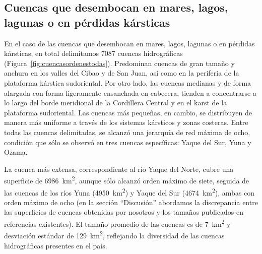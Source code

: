 \documentclass[spanish]{article}
\begin{document}
\hypertarget{cuencas-que-desembocan-en-mares-lagos-lagunas-o-en-puxe9rdidas-kuxe1rsticas}{%
\subsection{Cuencas que desembocan en mares, lagos, lagunas o en
pérdidas
kársticas}\label{cuencas-que-desembocan-en-mares-lagos-lagunas-o-en-puxe9rdidas-kuxe1rsticas}}

En el caso de las cuencas que desembocan en mares, lagos, lagunas o en
pérdidas kársticas, en total delimitamos 7087 cuencas hidrográficas
(Figura~\ref{fig:cuencasordenestodas}). Predominan cuencas de gran
tamaño y anchura en los valles del Cibao y de San Juan, así como en la
periferia de la plataforma kárstica sudoriental. Por otro lado, las
cuencas medianas y de forma alargada con forma ligeramente ensanchada en
cabecera, tienden a concentrarse a lo largo del borde meridional de la
Cordillera Central y en el karst de la plataforma sudoriental. Las
cuencas más pequeñas, en cambio, se distribuyen de manera más uniforme a
través de los sistemas kársticos y zonas costeras. Entre todas las
cuencas delimitadas, se alcanzó una jerarquía de red máxima de ocho,
condición que sólo se observó en tres cuencas específicas: Yaque del
Sur, Yuna y Ozama.

La cuenca más extensa, correspondiente al río Yaque del Norte, cubre una
superficie de 6986~km\textsuperscript{2}, aunque sólo alcanzó orden
máximo de siete, seguida de las cuencas de los ríos Yuna
(4950~km\textsuperscript{2}) y Yaque del Sur
(4674~km\textsuperscript{2}), ambas con orden máximo de ocho (en la
sección ``Discusión'' abordamos la discrepancia entre las superficies de
cuencas obtenidas por nosotros y los tamaños publicados en referencias
existentes). El tamaño promedio de las cuencas es de
7~km\textsuperscript{2} y desviación estándar de
129~km\textsuperscript{2}, reflejando la diversidad de las cuencas
hidrográficas presentes en el país.
\end{document}
